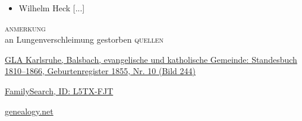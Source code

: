 \begin{person}[
    surname = {Noe},
    givenname = {Margaretha},
    suffix = {1855--1924},
    label = {@I505@},
    filename = {Margaretha Noe (1855)}
    ]
\begin{itemize}
\item Wilhelm Heck [...]
\end{itemize}
\medbreak
\textsc{anmerkung}\\
an Lungenverschleimung gestorben
\medbreak
\textsc{{quellen}}
\begin{enumerate}[label={[\arabic*]}]
\item \href{http://www.landesarchiv-bw.de/plink/?f=4-1120207-244}{GLA Karlsruhe, Balsbach, evangelische und katholische Gemeinde: Standesbuch 1810–1866, Geburtenregister 1855, Nr. 10 (Bild 244)}
\item \href{https://www.familysearch.org/tree/person/details/L5TX-FJT}{FamilySearch, ID: L5TX-FJT}
\item \href{http://gedbas.genealogy.net/person/show/1172957121}{genealogy.net}
\end{enumerate}

\end{person}

